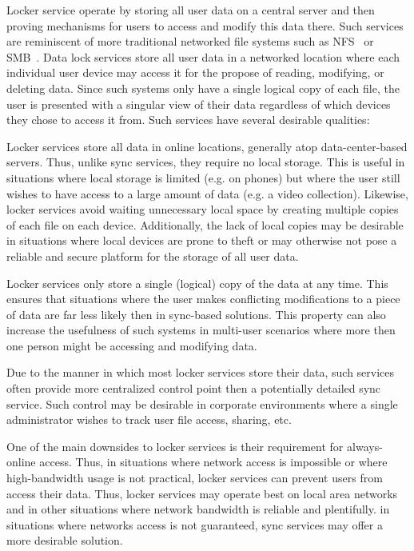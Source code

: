 Locker service operate by storing all user data on a central server
and then proving mechanisms for users to access and modify this data
there. Such services are reminiscent of more traditional networked
file systems such as NFS~\cite{Sandberg1985} or
SMB~\cite{microsoft-smb2}. Data lock services store all user data in a
networked location where each individual user device may access it for
the propose of reading, modifying, or deleting data. Since such
systems only have a single logical copy of each file, the user is
presented with a singular view of their data regardless of which
devices they chose to access it from. Such services have several
desirable qualities:

\begin{packed_desc}
\item[No Local Storage:] Locker services store all data in online
  locations, generally atop data-center-based servers. Thus, unlike
  sync services, they require no local storage. This is useful in
  situations where local storage is limited (e.g. on phones) but where
  the user still wishes to have access to a large amount of data
  (e.g. a video collection). Likewise, locker services avoid waiting
  unnecessary local space by creating multiple copies of each file on
  each device. Additionally, the lack of local copies may be desirable
  in situations where local devices are prone to theft or may
  otherwise not pose a reliable and secure platform for the storage of
  all user data.
\item[Single Source of Truth:] Locker services only store a single
  (logical) copy of the data at any time. This ensures that situations
  where the user makes conflicting modifications to a piece of data
  are far less likely then in sync-based solutions. This property can
  also increase the usefulness of such systems in multi-user scenarios
  where more then one person might be accessing and modifying data.
\item[Centralized Control:] Due to the manner in which most locker
  services store their data, such services often provide more
  centralized control point then a potentially detailed sync
  service. Such control may be desirable in corporate environments
  where a single administrator wishes to track user file access,
  sharing, etc.
\end{packed_desc}

One of the main downsides to locker services is their requirement for
always-online access. Thus, in situations where network access is
impossible or where high-bandwidth usage is not practical, locker
services can prevent users from access their data. Thus, locker
services may operate best on local area networks and in other
situations where network bandwidth is reliable and plentifully. in
situations where networks access is not guaranteed, sync services may
offer a more desirable solution.


